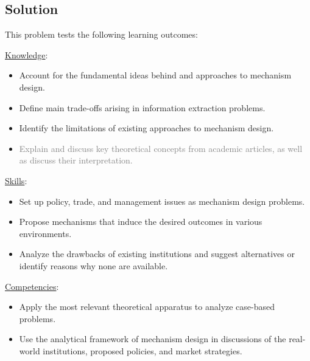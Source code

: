 \documentclass[a4paper]{article}
\newif\ifsolutions
\begin{document}
\ifsolutions
\subsection*{Solution}
	This problem tests the following learning outcomes:
	\begin{framed}
		\underline{Knowledge}:
		\begin{itemize}[$\circ$]
			\item {Account for the fundamental ideas behind and approaches to mechanism design.}
			\item {Define main trade-offs arising in information extraction problems.}
			\item {Identify the limitations of existing approaches to mechanism design.}
			\item \textcolor{gray}{Explain and discuss key theoretical concepts from academic articles, as well as discuss their interpretation.}
		\end{itemize}
		\underline{Skills}:
		\begin{itemize}[$\circ$]
			\item {Set up policy, trade, and management issues as mechanism design problems.}
			\item {Propose mechanisms that induce the desired outcomes in various environments.}
			\item {Analyze the drawbacks of existing institutions and suggest alternatives or identify reasons why none are available.}
		\end{itemize}
		\underline{Competencies}:
		\begin{itemize}[$\circ$]
			\item {Apply the most relevant theoretical apparatus to analyze case-based problems.}
			\item {Use the analytical framework of mechanism design in discussions of the real-world institutions, proposed policies, and market strategies.}
		\end{itemize}
	\end{framed}
	
\end{document}
